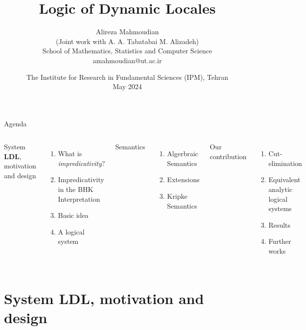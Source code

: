 \documentclass[handout]{beamer}
\title{Logic of Dynamic Locales}
\author{Alireza Mahmoudian\\ \small (Joint work with A. A. Tabatabai M. Alizadeh)\\ School of Mathematics, Statistics and Computer Science\\ amahmoudian@ut.ac.ir}
\institute{}
\date{The Institute for Research in Fundamental Sciences (IPM), Tehran\\ May 2024}
\begin{document}
\begin{frame}
	\maketitle
\end{frame}

\def\secSTL{System $\mathbf{LDL}$, motivation and design}
\def\subImprDef{What is \emph{impredicativity}?}
\def\subBHK{Impredicativity in the BHK Interpretation}
\def\subIdea{Basic idea}
\def\subSTL{A logical system}
\def\secSemantics{Semantics}
\def\subAlgSemantics{Algerbraic Semantics}
\def\subExtensions{Extensions}
\def\subKripSemantics{Kripke Semantics}
\def\secProposal{Our contribution}
\def\subAnalytic{Cut-elimination}
\def\subGSTL{Equivalent analytic logical systems}
\def\subResults{Results}
\def\subFurther{Further works}

\begin{frame}{Agenda}
	\footnotesize
	\begin{enumerate}
		\begin{columns}
		\item \secSTL
		\begin{enumerate}
			\item \subImprDef
			\item \subBHK
			\item \subIdea
			\item \subSTL
		\end{enumerate}
		\item \secSemantics
		\begin{enumerate}
			\item \subAlgSemantics
			\item \subExtensions
			\item \subKripSemantics
		\end{enumerate}
		\item \secProposal
		\begin{enumerate}
			\item \subAnalytic
			\item \subGSTL
			\item \subResults
			\item \subFurther
		\end{enumerate}
	\end{columns}
	\end{enumerate}
\end{frame}

\section{\secSTL}
\end{document}
